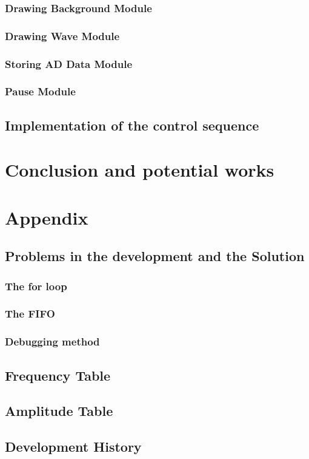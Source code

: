\documentclass[11pt]{scrartcl}
\begin{document}
\subsubsection{Drawing Background Module}
\subsubsection{Drawing Wave Module}
\subsubsection{Storing AD Data Module}
\subsubsection{Pause Module}
\subsection{Implementation of the control sequence}


\section{Conclusion and potential works}


\section{Appendix}
\subsection{Problems in the development and the Solution}
\subsubsection{The for loop}
\subsubsection{The FIFO}
\subsubsection{Debugging method}
\subsection{Frequency Table}
\subsection{Amplitude Table}
\subsection{Development History}





 
\end{document}
